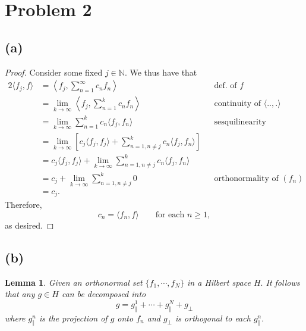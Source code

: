 \documentclass[10pt]{article}
\newtheorem{lemma}[]{Lemma}
\begin{document}
\newpage
\section*{Problem 2}

\subsection*{(a)}

\begin{proof}
    Consider some fixed $j\in\mathbb{N}.$ We thus have that
    \begin{alignat*}{2}
        \langle f_j, f\rangle &= \left\langle f_j,\sum_{n=1}^{\infty}c_nf_n\right\rangle &&\text{def. of $f$}\\
        &= \lim_{k\to\infty} \left\langle f_j, \sum_{n=1}^{k}c_nf_n\right\rangle \qquad&&\text{continuity of $\langle..,.\rangle$}\\
        &=\lim_{k\to\infty} \sum_{n=1}^{k} c_n\langle f_j,f_n\rangle &&\text{sesquilinearity}\\
        &= \lim_{k\to\infty} \left [ c_j\langle f_j, f_j\rangle + \sum_{n=1,n\neq j}^{k}c_n\langle f_j,f_n\rangle \right]\\
        &= c_j\langle f_j, f_j\rangle + \lim_{k\to\infty} \sum_{n=1,n\neq j}^{k}c_n\langle f_j,f_n\rangle\\
        &= c_j + \lim_{k\to\infty} \sum_{n=1,n\neq j}^{k} 0 &&\text{orthonormality of $(f_n)$}\\
        &= c_j. 
    \end{alignat*}
    Therefore,
    \[c_n = \langle f_n,f\rangle \qquad\text{for each }n\ge1,\]
    as desired.
\end{proof}

\subsection*{(b)}

\begin{lemma} \label{lem:1}
    Given an orthonormal set $\{ f_1,\cdots,f_N\}$ in a Hilbert space $H.$ It follows that any $g\in H$ can be decomposed into
    \[g = g^1_\Vert + \cdots + g^N_\Vert + g_\perp\]
    where $g^n_\Vert$ is the projection of $g$ onto $f_n$ and $g_\perp$ is orthogonal to each $g_\Vert^n.$ 
\end{lemma}
\end{document}
